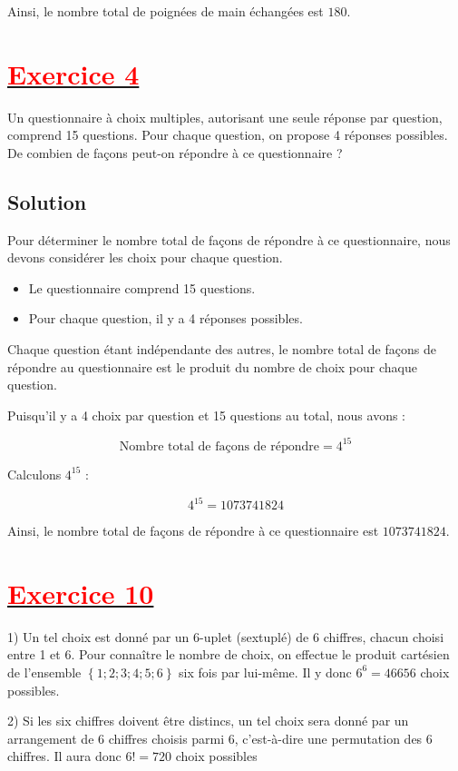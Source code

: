 \documentclass[12pt]{article}
\begin{document}
Ainsi, le nombre total de poignées de main échangées est \(\boxed{180}\).

\section*{\underline{\textbf{\textcolor{red}{Exercice 4}}}} 
Un questionnaire à choix multiples, autorisant une seule réponse par question, comprend 15 questions. Pour chaque question, on propose 4 réponses possibles.
De combien de façons peut-on répondre à ce questionnaire ?

\subsection*{Solution}

Pour déterminer le nombre total de façons de répondre à ce questionnaire, nous devons considérer les choix pour chaque question.

\begin{itemize}
    \item Le questionnaire comprend 15 questions.
    \item Pour chaque question, il y a 4 réponses possibles.
\end{itemize}

Chaque question étant indépendante des autres, le nombre total de façons de répondre au questionnaire est le produit du nombre de choix pour chaque question. 

Puisqu'il y a 4 choix par question et 15 questions au total, nous avons :

\[
\text{Nombre total de façons de répondre} = 4^{15}
\]

Calculons \(4^{15}\) :

\[
4^{15} = 1073741824
\]

Ainsi, le nombre total de façons de répondre à ce questionnaire est \(\boxed{1073741824}\).
\section*{\underline{\textbf{\textcolor{red}{Exercice 10}}}}
1) Un tel choix est donné par un 6-uplet (sextuplé) de 6 chiffres, chacun choisi entre 1 et 6. Pour connaître le nombre de choix, on effectue le produit cartésien de l’ensemble $\left\lbrace 1; 2;3; 4;5; 6\right\rbrace $ six fois par lui-même. Il y donc $6^{6} = 46656$ choix
possibles.

2) Si les six chiffres doivent être distincs, un tel choix sera donné par un arrangement de 6 chiffres choisis parmi 6, c’est-à-dire une permutation des 6 chiffres. Il aura donc $6 !=720$ choix possibles
\end{document}
